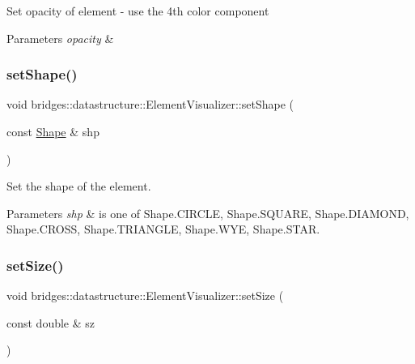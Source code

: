 Set opacity of element -\/ use the 4th color component


\begin{DoxyParams}{Parameters}
{\em opacity} & \\
\hline
\end{DoxyParams}
\mbox{\label{classbridges_1_1datastructure_1_1_element_visualizer_a316cccfc1e75ccbfdfe6d68da824b8b3}} 
\subsubsection{\texorpdfstring{set\+Shape()}{setShape()}}
{\footnotesize\ttfamily void bridges\+::datastructure\+::\+Element\+Visualizer\+::set\+Shape (\begin{DoxyParamCaption}\item[{const \hyperlink{namespacebridges_1_1datastructure_a3408f5f44d9c6062e5f3adb7e1bbb7f0}{Shape} \&}]{shp }\end{DoxyParamCaption})\hspace{0.3cm}{\ttfamily [inline]}}



Set the shape of the element. 


\begin{DoxyParams}{Parameters}
{\em shp} & is one of Shape.\+C\+I\+R\+C\+LE, Shape.\+S\+Q\+U\+A\+RE, Shape.\+D\+I\+A\+M\+O\+ND, Shape.\+C\+R\+O\+SS, Shape.\+T\+R\+I\+A\+N\+G\+LE, Shape.\+W\+YE, Shape.\+S\+T\+AR. \\
\hline
\end{DoxyParams}
\mbox{\label{classbridges_1_1datastructure_1_1_element_visualizer_a021333b1c20dd55627ac80ae3a2138e6}} 
\subsubsection{\texorpdfstring{set\+Size()}{setSize()}}
{\footnotesize\ttfamily void bridges\+::datastructure\+::\+Element\+Visualizer\+::set\+Size (\begin{DoxyParamCaption}\item[{const double \&}]{sz }\end{DoxyParamCaption})\hspace{0.3cm}{\ttfamily [inline]}}

